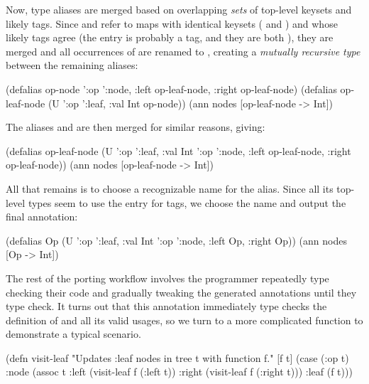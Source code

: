 Now, type aliases are merged based on overlapping \emph{sets} of top-level keysets and likely tags.
Since  and  refer to maps with identical keysets
( and ) and whose likely tags agree (the  entry
is probably a tag, and they are both ),
they are merged and all occurrences of 
are renamed to , creating a \emph{mutually recursive type}
between the remaining aliases:

\begin{cljlisting}
(defalias op-node '{:op ':node, :left op-leaf-node, :right op-leaf-node})
(defalias op-leaf-node (U '{:op ':leaf, :val Int} op-node))
(ann nodes [op-leaf-node -> Int])
\end{cljlisting}

The aliases  and  are then merged for similar reasons, giving:

\begin{cljlisting}
(defalias op-leaf-node (U '{:op ':leaf, :val Int}
                          '{:op ':node, :left op-leaf-node, :right op-leaf-node}))
(ann nodes [op-leaf-node -> Int])
\end{cljlisting}

All that remains is to choose a recognizable name for the alias.
Since all its top-level types seem to use the  entry for
tags, we choose the name  and output the final annotation:

\begin{cljlisting}
(defalias Op (U '{:op ':leaf, :val Int}
                '{:op ':node, :left Op, :right Op}))
(ann nodes [Op -> Int])
\end{cljlisting}

The rest of the porting workflow involves the programmer repeatedly type checking
their code and gradually tweaking the generated annotations until they type check.
It turns out that this annotation immediately type checks the definition of 
and all its valid usages, so we turn to a more complicated function 
to demonstrate a typical scenario.

\begin{cljlisting}
(defn visit-leaf "Updates :leaf nodes in tree t with function f."
  [f t] (case (:op t)
          :node (assoc t :left (visit-leaf f (:left t))
                         :right (visit-leaf f (:right t)))
          :leaf (f t)))
\end{cljlisting}

